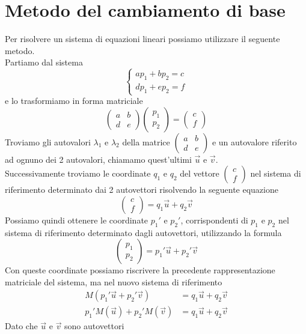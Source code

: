 \documentclass[10pt,a4paper]{article}
\theoremstyle{plain}
\theoremstyle{definition}
\begin{document}
\section{Metodo del cambiamento di base}
Per risolvere un sistema di equazioni lineari possiamo utilizzare il seguente metodo. \\
Partiamo dal sistema
\[
\begin{cases*}
	ap_1 + bp_2 = c \\
	dp_1 + ep_2 = f
\end{cases*}
\]
e lo trasformiamo in forma matriciale
\[
\begin{pmatrix}
	a & b \\
	d & e
\end{pmatrix}
\begin{pmatrix}
	p_1 \\
	p_2
\end{pmatrix}
= \begin{pmatrix}
	c \\
	f
\end{pmatrix}
\]
Troviamo gli autovalori $\lambda_1$ e $\lambda_2$ della matrice $\begin{pmatrix}
a & b \\
d & e
\end{pmatrix}$ e un autovalore riferito ad ognuno dei 2 autovalori, chiamamo quest'ultimi $\vec{u}$ e $\vec{v}$. \\
Successivamente troviamo le coordinate $q_1$ e $q_2$ del vettore $\begin{pmatrix}
c \\
f
\end{pmatrix}$ nel sistema di riferimento determinato dai 2 autovettori risolvendo la seguente equazione
\[
\begin{pmatrix}
c \\
f
\end{pmatrix}=q_1\vec{u} + q_2\vec{v}
\]
Possiamo quindi ottenere le coordinate $p_1'$ e $p_2'$, corrispondenti di $p_1$ e $p_2$ nel sistema di riferimento determinato dagli autovettori, utilizzando la formula 
\[
\begin{pmatrix}
	p_1 \\
	p_2
\end{pmatrix}=p_1'\vec{u}+p_2'\vec{v}
\]
Con queste coordinate possiamo riscrivere la precedente rappresentazione matriciale del sistema, ma nel nuovo sistema di riferimento
\begin{align*}
M(p_1'\vec{u}+p_2'\vec{v})&=q_1\vec{u}+q_2\vec{v}\\
p_1'M(\vec{u})+p_2'M(\vec{v})&=q_1\vec{u}+q_2\vec{v}
\end{align*}
Dato che $\vec{u}$ e $\vec{v}$ sono autovettori
\end{document}
